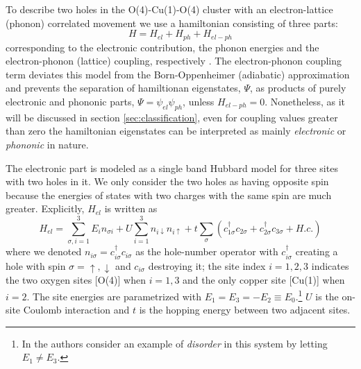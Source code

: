 To describe two holes in the O(4)-Cu(1)-O(4) cluster with an electron-lattice (phonon) correlated movement we use a hamiltonian consisting of three parts:
%
\begin{equation}
  \label{eq:full-hamiltonian}
  H = H_{el} + H_{ph} + H_{el-ph}
\end{equation}
%
corresponding to the electronic contribution, the phonon energies and the electron-phonon (lattice) coupling, respectively \cite{Salkola1994}. 
The electron-phonon coupling term deviates this model from the Born-Oppenheimer (adiabatic) approximation and prevents the separation of hamiltionan eigenstates, $\Psi$, as products of purely electronic and phononic parts, $\Psi=\psi_{el}\psi_{ph}$, unless $H_{el-ph}=0$.
Nonetheless, as it will be discussed in section \ref{sec:classification}, even for coupling values greater than zero the hamiltonian eigenstates can be interpreted as mainly \textit{electronic} or \textit{phononic} in nature.

The electronic part is modeled as a single band Hubbard model for three sites with two holes in it. 
We only consider the two holes as having opposite spin because the energies of states with two charges with the same spin are much greater.
Explicitly, $H_{el}$ is written as
%
\begin{equation}
  \label{eq:electronic-part}
  H_{el} = \sum_{\sigma,i=1}^3 E_i n_{\sigma i} 
        + U\sum_{i=1}^3 n_{i\downarrow}n_{i\uparrow} 
        + t\sum_{\sigma} \left(c_{1\sigma}^\dagger c_{2\sigma} + c_{2\sigma}^\dagger c_{3\sigma} + H.c. \right)
\end{equation}
%
where we denoted $n_{i\sigma}=c_{i\sigma}^\dagger c_{i\sigma}$ as the hole-number operator with $c_{i\sigma}^\dagger$ creating a hole with spin $\sigma = \uparrow, \downarrow$ and $c_{i\sigma}$ destroying it; the site index $i=1,2,3$ indicates the two oxygen sites [O(4)] when  $i=1,3$ and the only copper site [Cu(1)] when $i=2$. 
The site energies are parametrized with $E_1=E_3=-E_2 \equiv E_0$.\footnote{In \cite{Salkola1995} the authors consider an example of \textit{disorder} in this system by letting $E_1\neq E_3$.}
$U$ is the on-site Coulomb interaction and $t$ is the hopping energy between two adjacent sites. 

